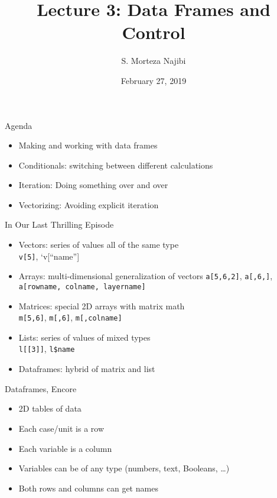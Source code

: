 \documentclass[8pt,ignorenonframetext,]{beamer}
\title{Lecture 3: Data Frames and Control}
\author{S. Morteza Najibi}
\date{February 27, 2019}
\providecommand{\tightlist}{%
  \setlength{\itemsep}{0pt}\setlength{\parskip}{0pt}}
\begin{document}
\frame{\titlepage}

\begin{frame}{Agenda}

\begin{itemize}
\tightlist
\item
  Making and working with data frames
\item
  Conditionals: switching between different calculations
\item
  Iteration: Doing something over and over
\item
  Vectorizing: Avoiding explicit iteration
\end{itemize}

\end{frame}

\begin{frame}[fragile]{In Our Last Thrilling Episode}

\begin{itemize}
\tightlist
\item
  Vectors: series of values all of the same type\\
  \texttt{v{[}5{]}}, `v{[}``name''{]}
\item
  Arrays: multi-dimensional generalization of vectors
  \texttt{a{[}5,6,2{]}}, \texttt{a{[},6,{]}},
  \texttt{a{[}rowname,\ colname,\ layername{]}}
\item
  Matrices: special 2D arrays with matrix math\\
  \texttt{m{[}5,6{]}}, \texttt{m{[},6{]}}, \texttt{m{[},colname{]}}
\item
  Lists: series of values of mixed types\\
  \texttt{l{[}{[}3{]}{]}}, \texttt{l\$name}
\item
  Dataframes: hybrid of matrix and list
\end{itemize}

\end{frame}

\begin{frame}{Dataframes, Encore}

\begin{itemize}
\tightlist
\item
  2D tables of data
\item
  Each case/unit is a row
\item
  Each variable is a column
\item
  Variables can be of any type (numbers, text, Booleans, \ldots{})
\item
  Both rows and columns can get names
\end{itemize}

\end{frame}
\end{document}
